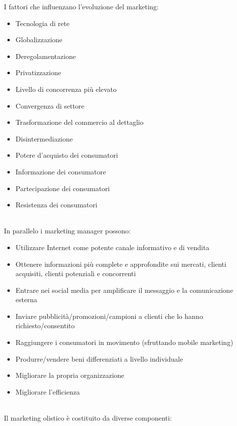 \documentclass[11pt]{article}
\begin{document}
\bigskip
\noindent I fattori che influenzano l'evoluzione del marketing:
\begin{itemize}[noitemsep, topsep=0ex]
	\item Tecnologia di rete
	\item Globalizzazione
	\item Deregolamentazione
	\item Privatizzazione
	\item Livello di concorrenza più elevato
	\item Convergenza di settore
	\item Trasformazione del commercio al dettaglio
	\item Disintermediazione
	\item Potere d'acquisto dei consumatori
	\item Informazione dei consumatore
	\item Partecipazione dei consumatori
	\item Resistenza dei consumatori
\end{itemize}
~\\
\noindent In parallelo i marketing manager possono:
\begin{itemize}[noitemsep,topsep=0ex]
	\item Utilizzare Internet come potente canale informativo e di vendita
	\item Ottenere informazioni più complete e approfondite sui mercati, clienti acquisiti, clienti potenziali e concorrenti
	\item Entrare nei social media per amplificare il messaggio e la comunicazione esterna
	\item Inviare pubblicità/promozioni/campioni a clienti che lo hanno richiesto/consentito
	\item Raggiungere i consumatori in movimento (sfruttando mobile marketing)
	\item Produrre/vendere beni differenziati a livello individuale
	\item Migliorare la propria organizzazione
	\item Migliorare l'efficienza
\end{itemize}
~\\
Il marketing olistico è costituito da diverse componenti:
\end{document}
